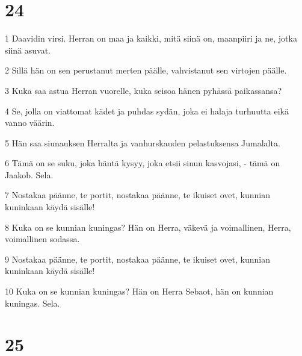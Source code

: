 \chapter{24}

\par 1 Daavidin virsi. Herran on maa ja kaikki, mitä siinä on, maanpiiri ja ne, jotka siinä asuvat.
\par 2 Sillä hän on sen perustanut merten päälle, vahvistanut sen virtojen päälle.
\par 3 Kuka saa astua Herran vuorelle, kuka seisoa hänen pyhässä paikassansa?
\par 4 Se, jolla on viattomat kädet ja puhdas sydän, joka ei halaja turhuutta eikä vanno väärin.
\par 5 Hän saa siunauksen Herralta ja vanhurskauden pelastuksensa Jumalalta.
\par 6 Tämä on se suku, joka häntä kysyy, joka etsii sinun kasvojasi, - tämä on Jaakob. Sela.
\par 7 Nostakaa päänne, te portit, nostakaa päänne, te ikuiset ovet, kunnian kuninkaan käydä sisälle!
\par 8 Kuka on se kunnian kuningas? Hän on Herra, väkevä ja voimallinen, Herra, voimallinen sodassa.
\par 9 Nostakaa päänne, te portit, nostakaa päänne, te ikuiset ovet, kunnian kuninkaan käydä sisälle!
\par 10 Kuka on se kunnian kuningas? Hän on Herra Sebaot, hän on kunnian kuningas. Sela.

\chapter{25}

